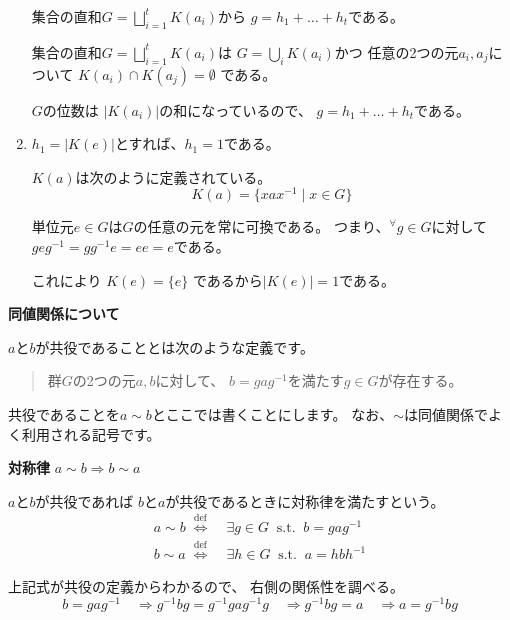 \documentclass[12pt,b5paper]{ltjsarticle}
\begin{document}
\begin{enumerate}
       集合の直和$G = \bigsqcup_{i=1}^{t} K(a_{i})$から
       $g=h_{1}+\dots + h_{t}$である。

       \dotfill

       集合の直和$G = \bigsqcup_{i=1}^{t} K(a_{i})$は
       $G = \bigcup_{i} K(a_{i})$かつ
       任意の2つの元$a_{i},a_{j}$について
       $K(a_{i}) \cap K(a_{j}) = \emptyset$
       である。

       $G$の位数は
       $|K(a_{i})|$の和になっているので、
       $g=h_{1}+\dots + h_{t}$である。

       \hrulefill

 \item $h_{1}=|K(e)|$とすれば、$h_{1}=1$である。

       \dotfill

       $K(a)$は次のように定義されている。
       \begin{equation}
        K(a) = \{xax^{-1} \mid x\in G \}
       \end{equation}

       単位元$e\in G$は$G$の任意の元を常に可換である。
       つまり、${}^{\forall}g\in G$に対して
       $geg^{-1}=gg^{-1}e=ee=e$である。

       これにより
       $K(e)=\{e\}$
       であるから$|K(e)|=1$である。

       \hrulefill

\end{enumerate}




\textbf{同値関係について}

$a$と$b$が共役であることとは次のような定義です。
\begin{quote}
 群$G$の2つの元$a,b$に対して、
 $b=gag^{-1}$を満たす$g\in G$が存在する。
\end{quote}
共役であることを$a\sim b$とここでは書くことにします。
なお、$\sim$は同値関係でよく利用される記号です。


\textbf{対称律}
$a \sim b \Rightarrow b \sim a$

$a$と$b$が共役であれば
$b$と$a$が共役であるときに対称律を満たすという。
\begin{align}
 a \sim b \; \overset{\mathrm{def}}{\Longleftrightarrow} & \;
  \exists g \in G \;\; \mathrm{s.t.} \;\; b=gag^{-1}\\
 b \sim a \; \overset{\mathrm{def}}{\Longleftrightarrow} & \;
  \exists h \in G \;\; \mathrm{s.t.} \;\; a=hbh^{-1}
\end{align}

上記式が共役の定義からわかるので、
右側の関係性を調べる。
\begin{equation}
 b=gag^{-1}
  \quad \Rightarrow g^{-1}bg = g^{-1}gag^{-1}g
  \quad \Rightarrow g^{-1}bg = a
  \quad \Rightarrow a = g^{-1}bg
\end{equation}
\end{document}
